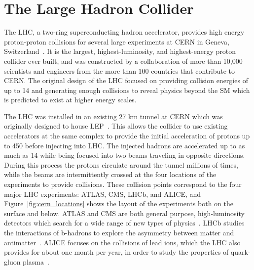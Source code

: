 \chapter{The Large Hadron Collider}

\label{ch:lhc}

The \ac{LHC}, a two-ring superconducting hadron accelerator, provides high energy proton-proton collisions for several large experiments at \ac{CERN} in Geneva, Switzerland~\cite{lhc_machine, lhc_guide}. 
It is the largest, highest-luminosity, and highest-energy proton collider ever built, and was constructed by a collaboration of more than 10,000 scientists and engineers from the more than 100 countries that contribute to \ac{CERN}.
The original design of the \ac{LHC} focused on providing collision energies of up to 14 \TeV and generating enough collisions to reveal physics beyond the \ac{SM} which is predicted to exist at higher energy scales.

The \ac{LHC} was installed in an existing 27 km tunnel at \ac{CERN} which was originally designed to house \ac{LEP}~\cite{lhc_machine}.
This allows the collider to use existing accelerators at the same complex to provide the initial acceleration of protons up to 450 \GeV before injecting into \ac{LHC}.
The injected hadrons are accelerated up to as much as 14 \TeV while being focused into two beams traveling in opposite directions.
During this process the protons circulate around the tunnel millions of times, while the beams are intermittently crossed at the four locations of the experiments to provide collisions.
These collision points correspond to the four major \ac{LHC} experiments: ATLAS, \ac{CMS}, \ac{LHCb}, and \ac{ALICE}, and Figure~\ref{fig:cern_locations} shows the layout of the experiments both on the surface and below.
ATLAS and \ac{CMS} are both general purpose, high-luminosity detectors which search for a wide range of new types of physics~\cite{atlas_experiment, cms_experiment}.
\ac{LHCb} studies the interactions of b-hadrons to explore the asymmetry between matter and antimatter~\cite{lhcb_experiment}.
\ac{ALICE} focuses on the collisions of lead ions, which the \ac{LHC} also provides for about one month per year, in order to study the properties of quark-gluon plasma~\cite{alice_experiment}.

